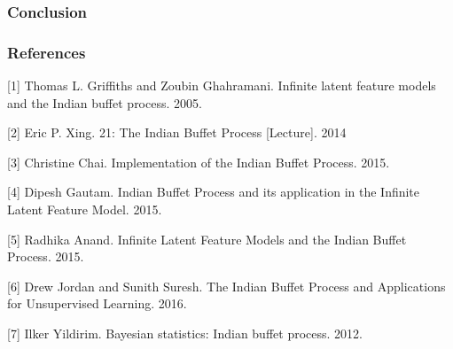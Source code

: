 \documentclass[11pt]{article}
\begin{document}
    \hypertarget{conclusion}{%
\subsubsection{Conclusion}\label{conclusion}}

    \hypertarget{references}{%
\subsubsection{References}\label{references}}

{[}1{]} Thomas L. Griffiths and Zoubin Ghahramani. Infinite latent
feature models and the Indian buffet process. 2005.

{[}2{]} Eric P. Xing. 21: The Indian Buffet Process {[}Lecture{]}. 2014

{[}3{]} Christine Chai. Implementation of the Indian Buffet Process.
2015.

{[}4{]} Dipesh Gautam. Indian Buffet Process and its application in the
Infinite Latent Feature Model. 2015.

{[}5{]} Radhika Anand. Infinite Latent Feature Models and the Indian
Buffet Process. 2015.

{[}6{]} Drew Jordan and Sunith Suresh. The Indian Buffet Process and
Applications for Unsupervised Learning. 2016.

{[}7{]} Ilker Yildirim. Bayesian statistics: Indian buffet process.
2012.


    
    
    
    
\end{document}
